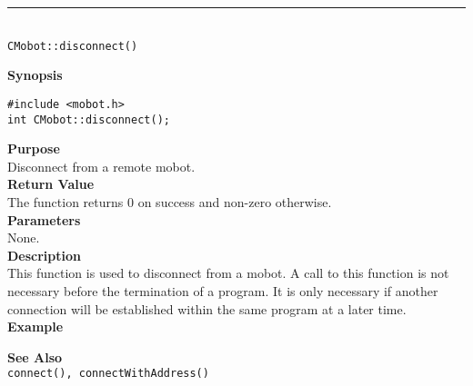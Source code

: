 \noindent
\vspace{5pt}
\rule{4.5in}{0.015in}\\
\noindent
{\LARGE \texttt{CMobot::disconnect()}}\\
{}

\noindent
{\bf Synopsis}
\vspace{-8pt}
\begin{verbatim}
#include <mobot.h>
int CMobot::disconnect();
\end{verbatim}

\noindent
{\bf Purpose}\\
Disconnect from a remote mobot.\\

\noindent
{\bf Return Value}\\
The function returns 0 on success and non-zero otherwise.\\

\noindent
{\bf Parameters}\\
None.\\

\noindent
{\bf Description}\\
This function is used to disconnect from a mobot. A call to this function is
not necessary before the termination of a program. It is only necessary if
another connection will be established within the same program at a later time.
\\

\noindent
{\bf Example}\\
\noindent

\noindent
{\bf See Also}\\
\texttt{connect(), connectWithAddress()}


